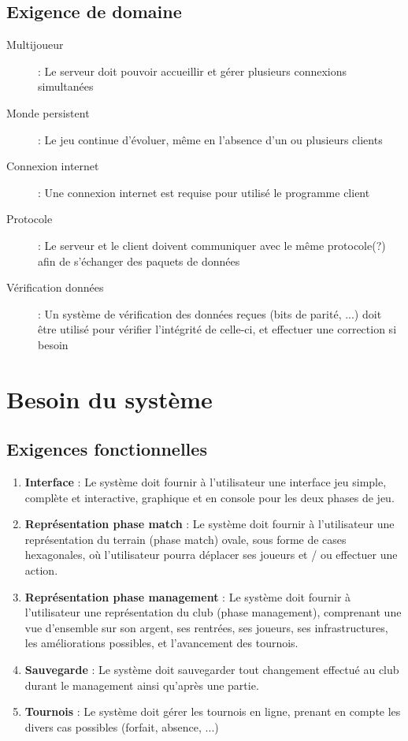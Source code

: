 \documentclass[a4paper]{article}
\begin{document}
\subsection{Exigence de domaine}
\begin{description}
\item[Multijoueur] : Le serveur doit pouvoir accueillir et gérer plusieurs connexions simultanées
\item[Monde persistent] : Le jeu continue d'évoluer, même en l'absence d'un ou plusieurs clients
\item[Connexion internet] : Une connexion internet est requise pour utilisé le programme client
\item[Protocole] : Le serveur et le client doivent communiquer avec le même protocole(?) afin de s'échanger des paquets de données
\item[Vérification données] : Un système de vérification des données reçues (bits de parité, ...) doit être utilisé pour vérifier l'intégrité de celle-ci, et effectuer une correction si besoin
\end{description}
\section{Besoin du système}
\subsection{Exigences fonctionnelles}

\begin{enumerate}
\item \textbf{Interface} : Le système doit fournir à l'utilisateur une interface jeu simple, complète et interactive, graphique et en console pour les deux phases de jeu.
\item \textbf{Représentation phase match} : Le système doit fournir à l'utilisateur une représentation du terrain (phase match) ovale, sous forme de cases hexagonales, où l'utilisateur pourra déplacer ses joueurs et / ou effectuer une action.
\item \textbf{Représentation phase management} : Le système doit fournir à l'utilisateur une représentation du \gls{club} (phase management), comprenant une vue d'ensemble sur son argent, ses rentrées, ses joueurs, ses infrastructures, les améliorations possibles, et l'avancement des tournois.
\item \textbf{Sauvegarde} : Le système doit sauvegarder tout changement effectué au \gls{club} durant le management ainsi qu'après une partie.
\item \textbf{Tournois} : Le système doit gérer les tournois en ligne, prenant en compte les divers cas possibles (forfait, absence, ...)
\end{enumerate}
\end{document}
